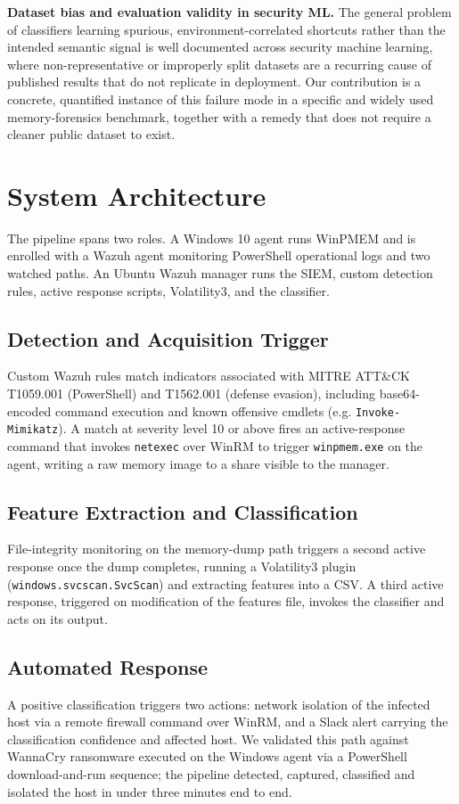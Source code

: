 \documentclass[conference]{IEEEtran}
\begin{document}
\textbf{Dataset bias and evaluation validity in security ML.} The general
problem of classifiers learning spurious, environment-correlated shortcuts
rather than the intended semantic signal is well documented across security
machine learning, where non-representative or improperly split datasets are a
recurring cause of published results that do not replicate in deployment. Our
contribution is a concrete, quantified instance of this failure mode in a
specific and widely used memory-forensics benchmark, together with a remedy
that does not require a cleaner public dataset to exist.

\section{System Architecture}
\label{sec:architecture}

The pipeline spans two roles. A Windows 10 agent runs WinPMEM and is enrolled
with a Wazuh agent monitoring PowerShell operational logs and two watched
paths. An Ubuntu Wazuh manager runs the SIEM, custom detection rules, active
response scripts, Volatility3, and the classifier.

\subsection{Detection and Acquisition Trigger}
Custom Wazuh rules match indicators associated with MITRE ATT\&CK T1059.001
(PowerShell) and T1562.001 (defense evasion), including base64-encoded command
execution and known offensive cmdlets (e.g. \texttt{Invoke-Mimikatz}). A match
at severity level 10 or above fires an active-response command that invokes
\texttt{netexec} over WinRM to trigger \texttt{winpmem.exe} on the agent,
writing a raw memory image to a share visible to the manager.

\subsection{Feature Extraction and Classification}
File-integrity monitoring on the memory-dump path triggers a second active
response once the dump completes, running a Volatility3 plugin
(\texttt{windows.svcscan.SvcScan}) and extracting features into a CSV. A third
active response, triggered on modification of the features file, invokes the
classifier and acts on its output.

\subsection{Automated Response}
A positive classification triggers two actions: network isolation of the
infected host via a remote firewall command over WinRM, and a Slack alert
carrying the classification confidence and affected host. We validated this
path against WannaCry ransomware executed on the Windows agent via a
PowerShell download-and-run sequence; the pipeline detected, captured,
classified and isolated the host in under three minutes end to end.
\end{document}
